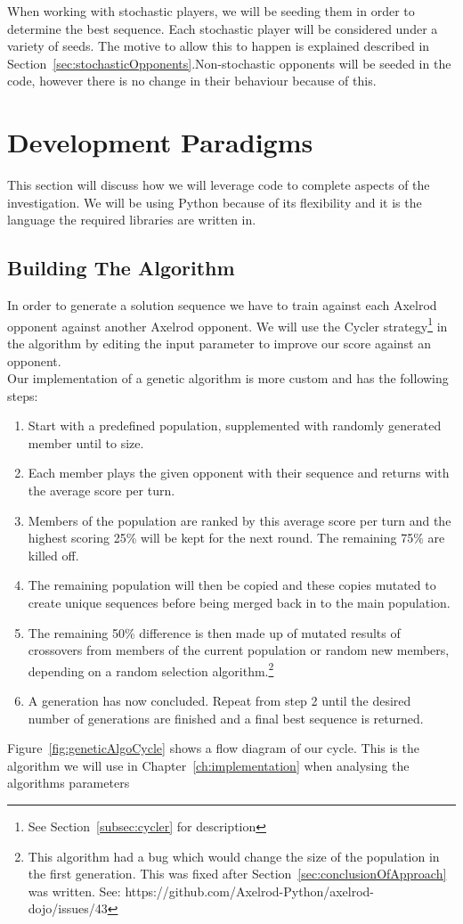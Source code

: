 When working with stochastic players, we will be seeding them in order to determine the best sequence.
Each stochastic player will be considered under a variety of seeds.
The motive to allow this to happen is explained described in Section~\ref{sec:stochasticOpponents}.Non-stochastic opponents will be seeded in the code, however there is no change in their behaviour because of this.

\section{Development Paradigms}\label{sec:codeTechniques}
This section will discuss how we will leverage code to complete aspects of the investigation.
We will be using Python because of its flexibility and it is the language the required libraries are written in.

\subsection{Building The Algorithm}\label{subsec:buildingTheAlgorthem}
In order to generate a solution sequence we have to train against each Axelrod opponent against another Axelrod opponent.
We will use the Cycler strategy\footnote{See Section~\ref{subsec:cycler} for description} in the algorithm by editing the input parameter to improve our score against an opponent.\\

Our implementation of a genetic algorithm is more custom and has the following steps:
\begin{enumerate}
    \item Start with a predefined population, supplemented with randomly generated member until to size.
    \item Each member plays the given opponent with their sequence and returns with the average score per turn.
    \item Members of the population are ranked by this average score per turn and the highest scoring 25\% will be kept for the next round.
    The remaining 75\% are killed off.
    \item The remaining population will then be copied and these copies mutated to create unique sequences before being merged back in to the main population.
    \item The remaining 50\% difference is then made up of mutated results of crossovers from members of the current population or random new members, depending on a random selection algorithm.\footnote{This algorithm had a bug which would change the size of the population in the first generation.
    This was fixed after Section~\ref{sec:conclusionOfApproach} was written.
    See: https://github.com/Axelrod-Python/axelrod-dojo/issues/43}
    \item A generation has now concluded.
    Repeat from step 2 until the desired number of generations are finished and a final best sequence is returned.
\end{enumerate}
Figure~\ref{fig:geneticAlgoCycle} shows a flow diagram of our cycle.
This is the algorithm we will use in Chapter~\ref{ch:implementation} when analysing the algorithms parameters\\

